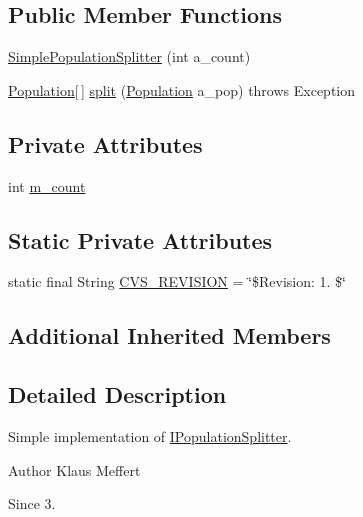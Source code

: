 \subsection*{Public Member Functions}
\begin{DoxyCompactItemize}
\item 
\hyperlink{classorg_1_1jgap_1_1impl_1_1job_1_1_simple_population_splitter_afd01755ea38b2246207c9866904d87c6}{Simple\-Population\-Splitter} (int a\-\_\-count)
\item 
\hyperlink{classorg_1_1jgap_1_1_population}{Population}\mbox{[}$\,$\mbox{]} \hyperlink{classorg_1_1jgap_1_1impl_1_1job_1_1_simple_population_splitter_aa8509aed8251aeddab03242c7cbf848f}{split} (\hyperlink{classorg_1_1jgap_1_1_population}{Population} a\-\_\-pop)  throws Exception 
\end{DoxyCompactItemize}
\subsection*{Private Attributes}
\begin{DoxyCompactItemize}
\item 
int \hyperlink{classorg_1_1jgap_1_1impl_1_1job_1_1_simple_population_splitter_a3183017696cd883e864e53c56e3433d7}{m\-\_\-count}
\end{DoxyCompactItemize}
\subsection*{Static Private Attributes}
\begin{DoxyCompactItemize}
\item 
static final String \hyperlink{classorg_1_1jgap_1_1impl_1_1job_1_1_simple_population_splitter_a1605b012477f7f3daff2a5a6468d9308}{C\-V\-S\-\_\-\-R\-E\-V\-I\-S\-I\-O\-N} = \char`\"{}\$Revision\-: 1. \$\char`\"{}
\end{DoxyCompactItemize}
\subsection*{Additional Inherited Members}


\subsection{Detailed Description}
Simple implementation of \hyperlink{interfaceorg_1_1jgap_1_1impl_1_1job_1_1_i_population_splitter}{I\-Population\-Splitter}.

\begin{DoxyAuthor}{Author}
Klaus Meffert 
\end{DoxyAuthor}
\begin{DoxySince}{Since}
3. 
\end{DoxySince}


